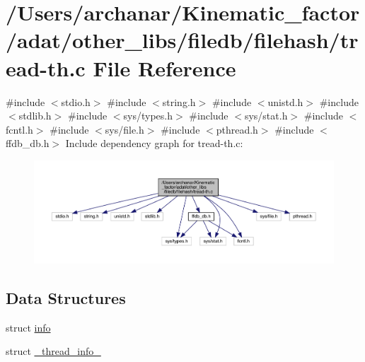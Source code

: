 \hypertarget{other__libs_2filedb_2filehash_2tread-th_8c}{}\section{/\+Users/archanar/\+Kinematic\+\_\+factor/adat/other\+\_\+libs/filedb/filehash/tread-\/th.c File Reference}
\label{other__libs_2filedb_2filehash_2tread-th_8c}
{\ttfamily \#include $<$stdio.\+h$>$}\newline
{\ttfamily \#include $<$string.\+h$>$}\newline
{\ttfamily \#include $<$unistd.\+h$>$}\newline
{\ttfamily \#include $<$stdlib.\+h$>$}\newline
{\ttfamily \#include $<$sys/types.\+h$>$}\newline
{\ttfamily \#include $<$sys/stat.\+h$>$}\newline
{\ttfamily \#include $<$fcntl.\+h$>$}\newline
{\ttfamily \#include $<$sys/file.\+h$>$}\newline
{\ttfamily \#include $<$pthread.\+h$>$}\newline
{\ttfamily \#include $<$ffdb\+\_\+db.\+h$>$}\newline
Include dependency graph for tread-\/th.c\+:
\nopagebreak
\begin{figure}[H]
\begin{center}
\leavevmode
\includegraphics[width=350pt]{d1/df6/other__libs_2filedb_2filehash_2tread-th_8c__incl}
\end{center}
\end{figure}
\subsection*{Data Structures}
\begin{DoxyCompactItemize}
\item 
struct \mbox{\hyperlink{structinfo}{info}}
\item 
struct \mbox{\hyperlink{struct__thread__info__}{\+\_\+thread\+\_\+info\+\_\+}}
\end{DoxyCompactItemize}
